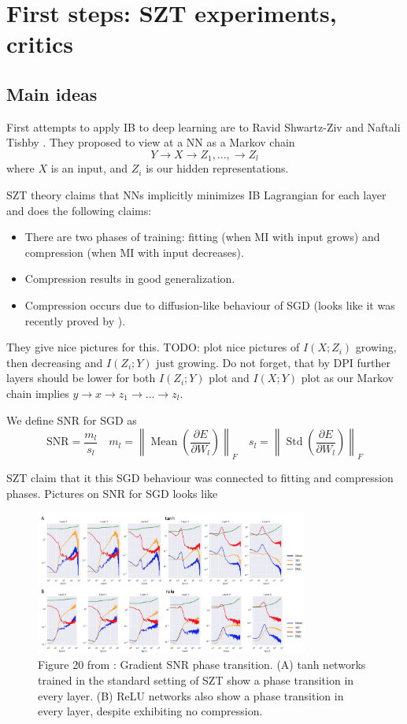 \documentclass{article}
\begin{document}
\section{First steps: SZT experiments, critics}

\subsection{Main ideas}
First attempts to apply IB to deep learning are to Ravid Shwartz-Ziv and Naftali Tishby \cite{DL_and_IB}.
They proposed to view at a NN as a Markov chain
\[
Y \to X \to Z_1, ... , \to Z_l
\]
where $X$ is an input, and $Z_i$ is our hidden representations.

SZT theory claims that NNs implicitly minimizes IB Lagrangian for each layer and does the following claims:
\begin{itemize}
    \item There are two phases of training: fitting (when MI with input grows) and compression (when MI with input decreases).
    \item Compression results in good generalization.
    \item Compression occurs due to diffusion-like behaviour of SGD (looks like it was recently proved by \cite{SGD_and_VI_and_FP}).
\end{itemize}

They give nice pictures for this.
TODO: plot nice pictures of $I(X; Z_i)$ growing, then decreasing and $I(Z_i; Y)$ just growing.
Do not forget, that by DPI further layers should be lower for both $I(Z_i; Y)$ plot and $I(X;Y)$ plot as our Markov chain implies $y \to x \to z_1 \to ... \to z_l$.

We define SNR for SGD as
\[
\mathrm{SNR}=\frac{m_{l}}{s_{l}} \quad m_{l}=\left\|\operatorname{Mean}\left(\frac{\partial E}{\partial W_{l}}\right)\right\|_{F} \quad s_{l}=\left\|\operatorname{Std}\left(\frac{\partial E}{\partial W_{l}}\right)\right\|_{F}
\]

SZT claim that it this SGD behaviour was connected to fitting and compression phases.
Pictures on SNR for SGD looks like
\begin{figure}[H]
\centering
\includegraphics[width=0.8\textwidth]{sgd-snr.png}
\caption{Figure 20 from \cite{DL_and_IB_critics}: Gradient SNR phase transition. (A) tanh networks trained in the standard setting of SZT show a phase transition in every layer. (B) ReLU networks also show a phase transition in every layer, despite exhibiting no compression.}
\end{figure}
\end{document}
